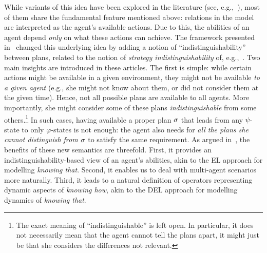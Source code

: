 \begin{textonuevo}
While variants of this idea have been explored in the literature (see, e.g.,~\cite{Li17,LiWang17,FervariHLW17,Wang19a}),
most of them share the fundamental feature mentioned above: relations in the model are interpreted as the agent's available actions. Due to this, the abilities of an agent depend \emph{only} on what these actions can achieve. The framework presented in~\cite{AFSVQ21,AFSVQ23report} changed this underlying idea by adding a notion of ``indistinguishability'' between plans, related to the notion of \emph{strategy indistinguishability} of, e.g.,~\cite{JamrogaH04,Belardinelli14}. Two main insights are introduced in these articles. The first is simple: while certain actions might be available in a given environment, they might not be available \emph{to a given agent} (e.g., she might not know about them, or did not consider them at the given time). Hence, not all possible plans are available to all agents.  More importantly, she might consider some of these plans \emph{indistinguishable} from some others.\footnote{The exact meaning of ``indistinguishable'' is left open. In particular, it does not necessarily mean that the agent cannot tell the plans apart, it might just be that she considers the differences not relevant.} In such cases, having available a proper plan $\sigma$ that leads from any $\psi$-state to only $\varphi$-states is not enough: the agent also needs for \emph{all the plans she cannot distinguish from $\sigma$} to satisfy the same requirement. As argued in~\cite{AFSVQ21}, the benefits of these new semantics are threefold. First, it provides an indistinguishability-based view of an agent's abilities, akin to the EL approach for modelling \emph{knowing that}. Second, it enables us to deal with multi-agent scenarios more naturally. Third, it leads to a natural definition of operators representing dynamic aspects of \emph{knowing how}, akin to the DEL approach for modelling dynamics of \emph{knowing that}.
%

\end{textonuevo}

